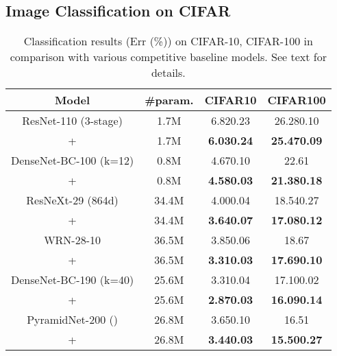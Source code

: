 \documentclass[final]{cvpr}
\begin{document}
\subsection{Image Classification on CIFAR}

\begin{table}[t]
    \centering
    \footnotesize
\begin{tabular}{c|c|c|c}
\toprule
Model & \#param. & CIFAR10 & CIFAR100 \\  
\midrule\midrule
ResNet-110 (3-stage) & 1.7M &  6.820.23& 26.280.10 \\
+\methodname{} & 1.7M & \textbf{6.030.24}& \textbf{25.470.09} \\

\midrule
DenseNet-BC-100 (k=12) & 0.8M & 4.670.10
& 22.61   \\
+\methodname{} &0.8M&\textbf{4.580.03} &  \textbf{21.380.18}\\
\midrule
ResNeXt-29 (864d) & 34.4M &4.000.04 &18.540.27  \\
+\methodname{} &34.4M&\textbf{3.640.07}&\textbf{17.080.12}\\
\midrule
WRN-28-10 & 36.5M &  3.850.06& 18.67 \\
+\methodname{} & 36.5M & \textbf{3.310.03} &  \textbf{17.690.10} \\
\midrule
DenseNet-BC-190 (k=40) & 25.6M &3.310.04 &17.100.02  \\
+\methodname{} &25.6M&\textbf{2.870.03}& \textbf{16.090.14}\\
\midrule
PyramidNet-200 () & 26.8M &3.650.10  & 16.51 \\
+\methodname{} & 26.8M & \textbf{3.440.03} &  \textbf{15.500.27} \\
\bottomrule
\end{tabular}
\caption{
Classification results (Err (\%)) on CIFAR-10, CIFAR-100 in comparison with various competitive baseline models. See text for details.
}
\label{tab:moex_cifar100_result1}     \vspace{-0.1in}
\end{table}
\end{document}
